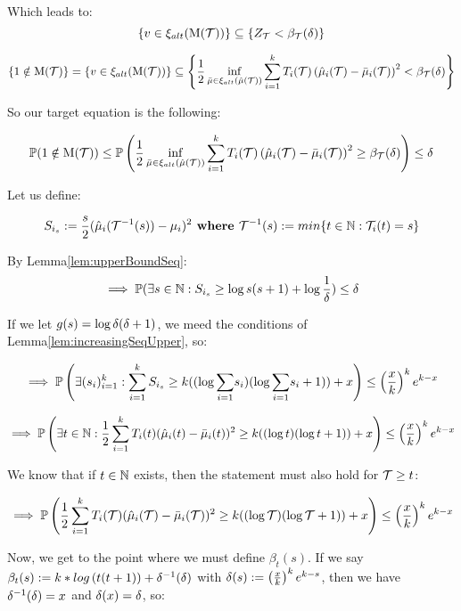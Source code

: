 Which leads to:
$$\left\{ v \in \xi_{alt}(\mathrm{M}({\mathcal{T}})) \right\} \subseteq \left\{ Z_{\mathcal{T}} < \beta_{\mathcal{T}}(\delta)\right\}$$

$$\left\{ 1 \notin \mathrm{M}({\mathcal{T}}) \right\} = \left\{ v \in \xi_{alt}(\mathrm{M}({\mathcal{T}})) \right\} \subseteq \left\{ \frac{1}{2}\inf\limits_{\bar{\mu} \in \xi_{alt}(\hat{\mu}(\mathcal{T}))} \sum_{i=1}^k T_i(\mathcal{T}) \left( \hat{\mu}_i(\mathcal{T}) - \bar{\mu}_i(\mathcal{T}) \right)^2 < \beta_{\mathcal{T}}(\delta)\right\}$$

So our target equation is the following:

\label{tar:track-and-stop}
$$\mathbb{P}( 1 \notin \mathrm{M}({\mathcal{T}})) \leq \mathbb{P}\left( \frac{1}{2}\inf\limits_{\bar{\mu} \in \xi_{alt}(\hat{\mu}(\mathcal{T}))} \sum_{i=1}^k T_i(\mathcal{T}) \left( \hat{\mu}_i(\mathcal{T}) - \bar{\mu}_i(\mathcal{T}) \right)^2 \geq \beta_{\mathcal{T}}(\delta)\right) \leq \delta$$

\seperator

Let us define:

$$S_{i_s} := \frac{s}{2}(\hat{\mu}_{i}(\mathcal{T}^{-1}(s)) - \mu_{i})^2 \textbf{ where } \mathcal{T}^{-1}(s) := min \{ t \in \mathbb{N} : \mathcal{T}_{i}(t) = s \}$$

By Lemma\ref{lem:upperBoundSeq}:
$$\implies \mathbb{P}(\exists s \in \mathbb{N} : S_{i_s} \geq \log{s(s+1)} + \log{\frac{1}{\delta}}) \leq \delta$$

If we let $g(s) = \log{\delta(\delta+ 1)}$, we meed the conditions of Lemma\ref{lem:increasingSeqUpper}, so:

$$\implies \mathbb{P} \left(\exists (s_i)_{i=1}^{k} : \sum_{i=1}^{k}S_{i_s} \geq k ((\log{\sum_{i=1}}s_i)(\log{\sum_{i=1}}s_i + 1)) + x \right) \leq \left(\frac{x}{k}\right)^k e^{k-x}$$

$$\implies \mathbb{P} \left(\exists t \in \mathbb{N} : \frac{1}{2}\sum_{i=1}^{k}T_i(t)(\hat{\mu}_{i}(t) - \bar{\mu}_{i}(t))^2 \geq k ((\log{t})(\log{t + 1})) + x \right) \leq \left(\frac{x}{k}\right)^k e^{k-x}$$

We know that if $t \in \mathbb{N}$ exists, then the statement must also hold for $\mathcal{T} \geq t$:

$$\implies \mathbb{P} \left(\frac{1}{2}\sum_{i=1}^{k} T_i(\mathcal{T})(\hat{\mu}_{i}(\mathcal{T}) - \bar{\mu}_{i}(\mathcal{T}))^2 \geq k ((\log{\mathcal{T}})(\log{\mathcal{T}+ 1})) + x \right) \leq \left(\frac{x}{k}\right)^k e^{k-x}$$

Now, we get to the point where we must define $\beta_{t}(s)$. If we say $\beta_{t}(s) := k * log\left(t(t+1)\right) + \delta^{-1}(\delta)$ with $\delta(s) := \left(\frac{x}{k}\right)^k e^{k-s}$, then we have $\delta^{-1}(\delta) = x$ and $\delta(x) = \delta$, so:

